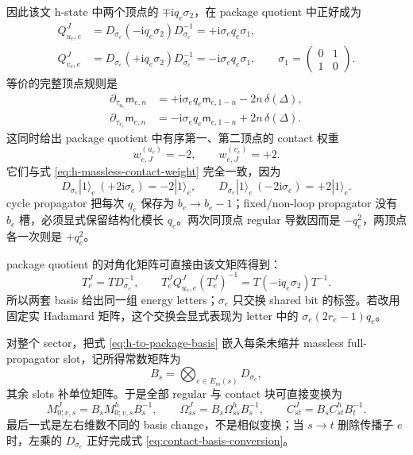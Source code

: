 \documentclass[11pt,a4paper]{ctexart}
\newcommand{\ii}{\mathrm i}
\begin{document}
因此该文 h-state 中两个顶点的 $\mp\ii q_e\sigma_2$，在 package quotient 中正好成为
\begin{align}
 Q^J_{u_e,e}
 &=D_{\sigma_e}(-\ii q_e\sigma_2)D_{\sigma_e}^{-1}
   =+\ii\sigma_eq_e\sigma_1,\\
 Q^J_{v_e,e}
 &=D_{\sigma_e}(+\ii q_e\sigma_2)D_{\sigma_e}^{-1}
   =-\ii\sigma_eq_e\sigma_1,
 \qquad
 \sigma_1=\begin{pmatrix}0&1\\1&0\end{pmatrix}.
 \label{eq:package-endpoint-generators}
\end{align}
等价的完整顶点规则是
\begin{align}
 \partial_{\tau_{u_e}}\mathsf m_{e,n}
 &=+\ii\sigma_eq_e\mathsf m_{e,1-n}-2n\,\delta(\Delta),\\
 \partial_{\tau_{v_e}}\mathsf m_{e,n}
 &=-\ii\sigma_eq_e\mathsf m_{e,1-n}+2n\,\delta(\Delta).
 \label{eq:package-massless-time-rules}
\end{align}
这同时给出 package quotient 中有序第一、第二顶点的 contact 权重
\begin{equation}
 w_{e,J}^{(u_e)}=-2,
 \qquad
 w_{e,J}^{(v_e)}=+2.
 \label{eq:package-massless-contact-weight}
\end{equation}
它们与式 \eqref{eq:h-massless-contact-weight} 完全一致，因为
\begin{equation}
 D_{\sigma_e}|1\rangle_e\,(+2\ii\sigma_e)=-2|1\rangle_e,
 \qquad
 D_{\sigma_e}|1\rangle_e\,(-2\ii\sigma_e)=+2|1\rangle_e.
 \label{eq:contact-basis-conversion}
\end{equation}
cycle propagator 把每次 $q_e$ 保存为 $b_e\to b_e-1$；fixed/non-loop propagator 没有 $b_e$ 槽，必须显式保留结构化模长 $q_e$。两次同顶点 regular 导数因而是 $-q_e^2$，两顶点各一次则是 $+q_e^2$。

package quotient 的对角化矩阵可直接由该文矩阵得到：
\begin{equation}
 T_e^J=T D_{\sigma_e}^{-1},
 \qquad
 T_e^JQ^J_{u_e,e}(T_e^J)^{-1}
 =T(-\ii q_e\sigma_2)T^{-1}.
 \label{eq:package-diagonalizer}
\end{equation}
所以两套 basis 给出同一组 energy letters；$\sigma_e$ 只交换 shared bit 的标签。若改用固定实 Hadamard 矩阵，这个交换会显式表现为 letter 中的 $\sigma_e(2r_e-1)q_e$。

对整个 sector，把式 \eqref{eq:h-to-package-basis} 嵌入每条未缩并 massless full-propagator slot，记所得常数矩阵为
\begin{equation}
 B_s=\bigotimes_{e\in E_m(s)}D_{\sigma_e},
 \label{eq:global-package-basis}
\end{equation}
其余 slots 补单位矩阵。于是全部 regular 与 contact 块可直接变换为
\begin{equation}
 M_{0;v,s}^{J}=B_sM_{0;v,s}^{h}B_s^{-1},
 \qquad
 \Omega_{ss}^{J}=B_s\Omega_{ss}^{h}B_s^{-1},
 \qquad
 C_{st}^{J}=B_sC_{st}^{h}B_t^{-1}.
 \label{eq:global-package-similarity}
\end{equation}
最后一式是左右维数不同的 basis change，不是相似变换；当 $s\to t$ 删除传播子 $e$ 时，左乘的 $D_{\sigma_e}$ 正好完成式 \eqref{eq:contact-basis-conversion}。
\end{document}
